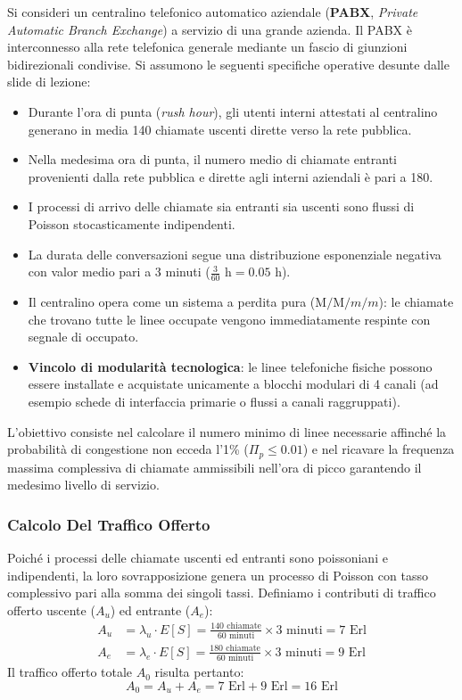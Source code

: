 \documentclass[11pt, a4paper]{article}
\begin{document}
Si consideri un centralino telefonico automatico aziendale (\textbf{PABX}, \emph{Private Automatic Branch Exchange}) a servizio di una grande azienda. Il PABX è interconnesso alla rete telefonica generale mediante un fascio di giunzioni bidirezionali condivise. Si assumono le seguenti specifiche operative desunte dalle slide di lezione:
\begin{itemize}[noitemsep]
    \item Durante l'ora di punta (\emph{rush hour}), gli utenti interni attestati al centralino generano in media 140 chiamate uscenti dirette verso la rete pubblica.
    \item Nella medesima ora di punta, il numero medio di chiamate entranti provenienti dalla rete pubblica e dirette agli interni aziendali è pari a 180.
    \item I processi di arrivo delle chiamate sia entranti sia uscenti sono flussi di Poisson stocasticamente indipendenti.
    \item La durata delle conversazioni segue una distribuzione esponenziale negativa con valor medio pari a 3 minuti ($\frac{3}{60}\text{ h} = 0.05\text{ h}$).
    \item Il centralino opera come un sistema a perdita pura ($\text{M/M/}m/m$): le chiamate che trovano tutte le linee occupate vengono immediatamente respinte con segnale di occupato.
    \item \textbf{Vincolo di modularità tecnologica}: le linee telefoniche fisiche possono essere installate e acquistate unicamente a blocchi modulari di 4 canali (ad esempio schede di interfaccia primarie o flussi a canali raggruppati).
\end{itemize}

L'obiettivo consiste nel calcolare il numero minimo di linee necessarie affinché la probabilità di congestione non ecceda l'1\% ($\Pi_p \le 0.01$) e nel ricavare la frequenza massima complessiva di chiamate ammissibili nell'ora di picco garantendo il medesimo livello di servizio.


\subsubsection{Calcolo Del Traffico Offerto}

Poiché i processi delle chiamate uscenti ed entranti sono poissoniani e indipendenti, la loro sovrapposizione genera un processo di Poisson con tasso complessivo pari alla somma dei singoli tassi. Definiamo i contributi di traffico offerto uscente ($A_u$) ed entrante ($A_e$):
\begin{align*}
    A_u &= \lambda_u \cdot E[S] = \frac{140\text{ chiamate}}{60\text{ minuti}} \times 3\text{ minuti} = 7\text{ Erl} \\
    A_e &= \lambda_e \cdot E[S] = \frac{180\text{ chiamate}}{60\text{ minuti}} \times 3\text{ minuti} = 9\text{ Erl}
\end{align*}
Il traffico offerto totale $A_0$ risulta pertanto:
\[
A_0 = A_u + A_e = 7\text{ Erl} + 9\text{ Erl} = 16\text{ Erl}
\]
\end{document}
